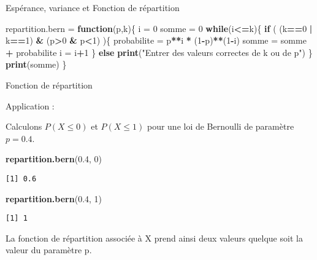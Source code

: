 \documentclass[
  ignorenonframetext,
]{beamer}
\newenvironment{Shaded}{\begin{snugshade}}{\end{snugshade}}
\newcommand{\ControlFlowTok}[1]{\textcolor[rgb]{0.13,0.29,0.53}{\textbf{#1}}}
\newcommand{\DecValTok}[1]{\textcolor[rgb]{0.00,0.00,0.81}{#1}}
\newcommand{\FloatTok}[1]{\textcolor[rgb]{0.00,0.00,0.81}{#1}}
\newcommand{\FunctionTok}[1]{\textcolor[rgb]{0.13,0.29,0.53}{\textbf{#1}}}
\newcommand{\NormalTok}[1]{#1}
\newcommand{\OtherTok}[1]{\textcolor[rgb]{0.56,0.35,0.01}{#1}}
\newcommand{\SpecialCharTok}[1]{\textcolor[rgb]{0.81,0.36,0.00}{\textbf{#1}}}
\newcommand{\StringTok}[1]{\textcolor[rgb]{0.31,0.60,0.02}{#1}}
\begin{document}
\begin{frame}[fragile]{Espérance, variance et Fonction de répartition}
\protect\hypertarget{espuxe9rance-variance-et-fonction-de-ruxe9partition-1}{}
\begin{Shaded}
\begin{Highlighting}[]
\NormalTok{repartition.bern }\OtherTok{=} \ControlFlowTok{function}\NormalTok{(p,k)\{}
\NormalTok{  i     }\OtherTok{=} \DecValTok{0}
\NormalTok{  somme }\OtherTok{=} \DecValTok{0}
  \ControlFlowTok{while}\NormalTok{(i}\SpecialCharTok{\textless{}=}\NormalTok{k)\{}
    \ControlFlowTok{if}\NormalTok{ ( (k}\SpecialCharTok{==}\DecValTok{0} \SpecialCharTok{|}\NormalTok{ k}\SpecialCharTok{==}\DecValTok{1}\NormalTok{) }\SpecialCharTok{\&}\NormalTok{ (p}\SpecialCharTok{\textgreater{}}\DecValTok{0} \SpecialCharTok{\&}\NormalTok{ p}\SpecialCharTok{\textless{}}\DecValTok{1}\NormalTok{) )\{}
\NormalTok{      probabilite }\OtherTok{=}\NormalTok{ p}\SpecialCharTok{**}\NormalTok{i }\SpecialCharTok{*}\NormalTok{ (}\DecValTok{1}\SpecialCharTok{{-}}\NormalTok{p)}\SpecialCharTok{**}\NormalTok{(}\DecValTok{1}\SpecialCharTok{{-}}\NormalTok{i)}
\NormalTok{      somme }\OtherTok{=}\NormalTok{ somme }\SpecialCharTok{+}\NormalTok{ probabilite}
\NormalTok{      i }\OtherTok{=}\NormalTok{ i}\SpecialCharTok{+}\DecValTok{1}
\NormalTok{      \} }\ControlFlowTok{else}
        \FunctionTok{print}\NormalTok{(}\StringTok{"Entrer des valeurs correctes de k ou de p"}\NormalTok{)}
\NormalTok{  \}}
  \FunctionTok{print}\NormalTok{(somme)}
\NormalTok{\}}
\end{Highlighting}
\end{Shaded}
\end{frame}

\begin{frame}[fragile]{Fonction de répartition}
\protect\hypertarget{fonction-de-ruxe9partition}{}

Application : 


Calculons \(P(X \le 0)\) et \(P(X \le 1)\) pour une loi de Bernoulli de
paramètre \(p=0.4\).

\begin{Shaded}
\begin{Highlighting}[]
\FunctionTok{repartition.bern}\NormalTok{(}\FloatTok{0.4}\NormalTok{, }\DecValTok{0}\NormalTok{) }
\end{Highlighting}
\end{Shaded}

\begin{verbatim}
[1] 0.6
\end{verbatim}

\begin{Shaded}
\begin{Highlighting}[]
\FunctionTok{repartition.bern}\NormalTok{(}\FloatTok{0.4}\NormalTok{, }\DecValTok{1}\NormalTok{)}
\end{Highlighting}
\end{Shaded}

\begin{verbatim}
[1] 1
\end{verbatim}

La fonction de répartition associée à X prend ainsi deux valeurs quelque
soit la valeur du paramètre p.
\end{frame}
\end{document}
